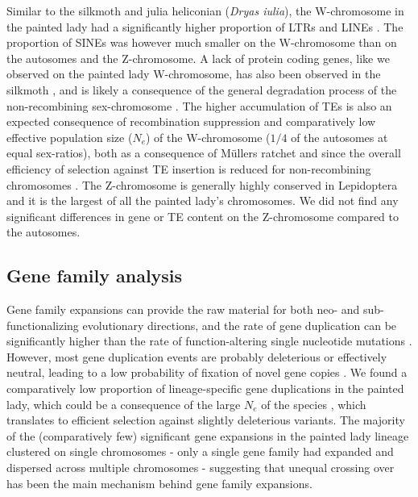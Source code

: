 \documentclass[twocolumn]{bmcart}%
\begin{document}
Similar to the silkmoth and julia heliconian (\textit{Dryas iulia}), the W-chromosome in the painted lady had a significantly higher proportion of LTRs and LINEs \cite{lewisDryasIuliaGenome2021, mitaGenomeSequenceSilkworm2004}. The proportion of SINEs was however much smaller on the W-chromosome than on the autosomes and the Z-chromosome. A lack of protein coding genes, like we observed on the painted lady W-chromosome, has also been observed in the silkmoth \cite{mitaGenomeSequenceSilkworm2004}, and is likely a consequence of the general degradation process of the non-recombining sex-chromosome \cite{bachtrogChromosomeEvolutionEmerging2013}. The higher accumulation of TEs is also an expected consequence of recombination suppression and comparatively low effective population size ($N_e$) of the W-chromosome ($1/4$ of the autosomes at equal sex-ratios), both as a consequence of Müllers ratchet and since the overall efficiency of selection against TE insertion is reduced for non-recombining chromosomes \cite{bachtrogChromosomeEvolutionEmerging2013}. The Z-chromosome is generally highly conserved in Lepidoptera \cite{fraisseDeepConservationLepidoptera2017} and it is the largest of all the painted lady’s chromosomes. We did not find any significant differences in gene or TE content on the Z-chromosome compared to the autosomes.

\subsection*{Gene family analysis}
Gene family expansions can provide the raw material for both neo- and sub-functionalizing evolutionary directions, and the rate of gene duplication can be significantly higher than the rate of function-altering single nucleotide mutations \cite{lipinskiHighSpontaneousRate2011}. However, most gene duplication events are probably deleterious \cite{loehlinExpressionTandemGene2016} or effectively neutral, leading to a low probability of fixation of novel gene copies \cite{emersonNaturalSelectionShapes2008}. We found a comparatively low proportion of lineage-specific gene duplications in the painted lady, which could be a consequence of the large $N_e$ of the species \cite{garcia-berroGenomicDemographicInferenceinprep}, which translates to efficient selection against slightly deleterious variants. The majority of the (comparatively few) significant gene expansions in the painted lady lineage clustered on single chromosomes - only a single gene family had expanded and dispersed across multiple chromosomes - suggesting that unequal crossing over has been the main mechanism behind gene family expansions.
\end{document}
